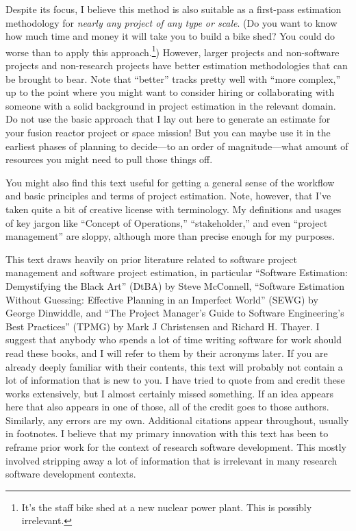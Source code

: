 \documentclass[12pt,oneside]{book}
\begin{document}
Despite its focus, I believe this method is also suitable as a first-pass estimation methodology for \emph{nearly any project of any type or scale}. (Do you want to know how much time and money it will take you to build a bike shed? You could do worse than to apply this approach.\footnote{It's the staff bike shed at a new nuclear power plant. This is possibly irrelevant.}) However, larger projects and non-software projects and non-research projects have better estimation methodologies that can be brought to bear. Note that ``better'' tracks pretty well with ``more complex,'' up to the point where you might want to consider hiring or collaborating with someone with a solid background in project estimation in the relevant domain. Do not use the basic approach that I lay out here to generate an estimate for your fusion reactor project or space mission! But you can maybe use it in the earliest phases of planning to decide---to an order of magnitude---what amount of resources you might need to pull those things off.

You might also find this text useful for getting a general sense of the workflow and basic principles and terms of project estimation. Note, however, that I've taken quite a bit of creative license with terminology. My definitions and usages of key jargon like ``Concept of Operations,'' ``stakeholder,'' and even ``project management'' are sloppy, although more than precise enough for my purposes.

This text draws heavily on prior literature related to software project management and software project estimation, in particular ``Software Estimation: Demystifying the Black Art'' (DtBA) by Steve McConnell, ``Software Estimation Without Guessing: Effective Planning in an Imperfect World'' (SEWG) by George Dinwiddle, and ``The Project Manager's Guide to Software Engineering's Best Practices'' (TPMG) by Mark J Christensen and Richard H. Thayer. I suggest that anybody who spends a lot of time writing software for work should read these books, and I will refer to them by their acronyms later. If you are already deeply familiar with their contents, this text will probably not contain a lot of information that is new to you. I have tried to quote from and credit these works extensively, but I almost certainly missed something. If an idea appears here that also appears in one of those, all of the credit goes to those authors. Similarly, any errors are my own. Additional citations appear throughout, usually in footnotes. I believe that my primary innovation with this text has been to reframe prior work for the context of research software development. This mostly involved stripping away a lot of information that is irrelevant in many research software development contexts.
\end{document}

